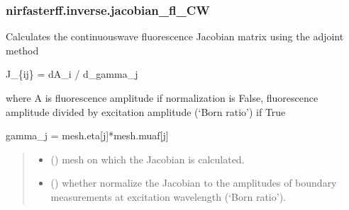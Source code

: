 \documentclass[letterpaper,10pt,english]{sphinxmanual}
\begin{document}
\sphinxstepscope


\subsubsection{nirfasterff.inverse.jacobian\_fl\_CW}
\label{\detokenize{_autosummary/nirfasterff.inverse.jacobian_fl_CW:nirfasterff-inverse-jacobian-fl-cw}}\label{\detokenize{_autosummary/nirfasterff.inverse.jacobian_fl_CW::doc}}

\begin{fulllineitems}
\label{\detokenize{_autosummary/nirfasterff.inverse.jacobian_fl_CW:nirfasterff.inverse.jacobian_fl_CW}}
\pysigstartsignatures
{}
\pysigstopsignatures
\sphinxAtStartPar
Calculates the continuous\sphinxhyphen{}wave fluorescence Jacobian matrix using the adjoint method

\sphinxAtStartPar
J\_\{ij\} = dA\_i / d\_gamma\_j

\sphinxAtStartPar
where A is fluorescence amplitude if normalization is False, fluorescence amplitude divided by excitation amplitude (‘Born ratio’) if True

\sphinxAtStartPar
gamma\_j = mesh.eta{[}j{]}*mesh.muaf{[}j{]}
\begin{quote}\begin{description}
\begin{itemize}
\item {} 
\sphinxAtStartPar
{} () \textendash{} mesh on which the Jacobian is calculated.

\item {} 
\sphinxAtStartPar
{} (\sphinxstyleliteralemphasis{\sphinxupquote{, }}) \textendash{} 
\sphinxAtStartPar
whether normalize the Jacobian to the amplitudes of boundary measurements at excitation wavelength (‘Born ratio’).


\end{itemize}
\end{description}
\end{quote}
\end{fulllineitems}
\end{document}
